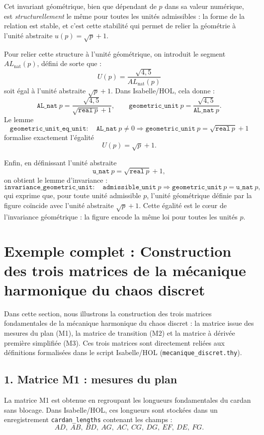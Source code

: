 \documentclass[12pt,a4paper]{article}
\theoremstyle{definition}
\theoremstyle{remark}
\begin{document}
Cet invariant géométrique, bien que dépendant de $p$ dans sa valeur numérique,
est \emph{structurellement} le même pour toutes les unités admissibles : la
forme de la relation est stable, et c'est cette stabilité qui permet de
relier la géométrie à l'unité abstraite $u(p) = \sqrt{p} + 1$.

Pour relier cette structure à l'unité géométrique, on introduit le segment
$AL_{\text{nat}}(p)$, défini de sorte que :
\[
  U(p) = \frac{\sqrt{4{,}5}}{AL_{\text{nat}}(p)}
\]
soit égal à l'unité abstraite $\sqrt{p} + 1$. Dans Isabelle/HOL, cela donne :
\[
  \texttt{AL\_nat}\ p = \frac{\sqrt{4{,}5}}{\sqrt{\texttt{real}\ p} + 1},
  \qquad
  \texttt{geometric\_unit}\ p = \frac{\sqrt{4{,}5}}{\texttt{AL\_nat}\ p}.
\]
Le lemme
\[
  \texttt{geometric\_unit\_eq\_unit} :
  \quad \texttt{AL\_nat}\ p \neq 0
  \Longrightarrow
  \texttt{geometric\_unit}\ p = \sqrt{\texttt{real}\ p} + 1
\]
formalise exactement l'égalité
\[
  U(p) = \sqrt{p} + 1.
\]

Enfin, en définissant l'unité abstraite
\[
  \texttt{u\_nat}\ p = \sqrt{\texttt{real}\ p} + 1,
\]
on obtient le lemme d'invariance :
\[
  \texttt{invariance\_geometric\_unit} :
  \quad \texttt{admissible\_unit}\ p
  \Longrightarrow
  \texttt{geometric\_unit}\ p = \texttt{u\_nat}\ p,
\]
qui exprime que, pour toute unité admissible $p$, l'unité géométrique
définie par la figure coïncide avec l'unité abstraite $\sqrt{p} + 1$.
Cette égalité est le cœur de l'invariance géométrique : la figure encode
la même loi pour toutes les unités $p$.

\section{Exemple complet : Construction des trois matrices de la mécanique harmonique du chaos discret}

Dans cette section, nous illustrons la construction des trois matrices fondamentales
de la mécanique harmonique du chaos discret : la matrice issue des mesures du plan
(M1), la matrice de transition (M2) et la matrice à dérivée première simplifiée (M3).
Ces trois matrices sont directement reliées aux définitions formalisées dans le
script Isabelle/HOL (\texttt{mecanique\_discret.thy}).

\subsection{1. Matrice M1 : mesures du plan}

La matrice M1 est obtenue en regroupant les longueurs fondamentales du cardan
sans blocage. Dans Isabelle/HOL, ces longueurs sont stockées dans un enregistrement
\texttt{cardan\_lengths} contenant les champs :
\[
  AD,\ AB,\ BD,\ AG,\ AC,\ CG,\ DG,\ EF,\ DE,\ FG.
\]
\end{document}
